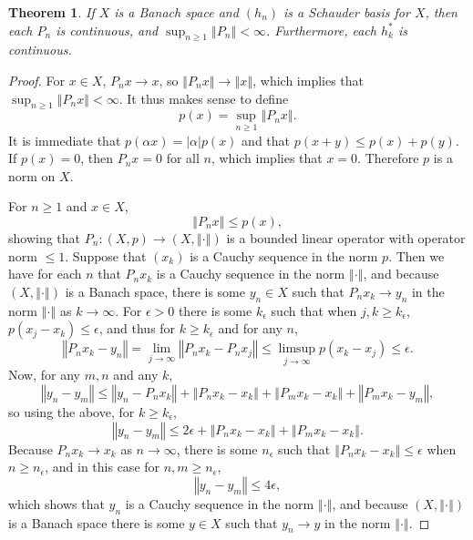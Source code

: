 \documentclass{article}
\newcommand{\norm}[1]{\left\Vert #1 \right\Vert}
\newtheorem{theorem}{Theorem}
\theoremstyle{definition}
\begin{document}
\begin{theorem}
If $X$ is a Banach space and $(h_n)$ is a Schauder basis for $X$, then each $P_n$ is continuous, and 
$\sup_{n \geq 1} \norm{P_n}<\infty$.  Furthermore, each $h_k^*$ is continuous.
\label{projections}
\end{theorem}
\begin{proof}
For $x \in X$, $P_n x \to x$, so $\norm{P_n x} \to \norm{x}$, which implies that $\sup_{n \geq 1} \norm{P_n x}<\infty$.
It thus makes sense to define
\[
p(x) = \sup_{n \geq 1} \norm{P_n x}.
\]
It is immediate that $p(\alpha x) = |\alpha| p(x)$ and that $p(x+y) \leq p(x) + p(y)$. If $p(x)=0$, then $P_nx=0$ for all $n$, 
which implies that $x=0$. Therefore $p$ is a norm on $X$. 

For $n \geq 1$ and $x \in X$,
\[
\norm{P_n x} \leq
p(x),
\]
showing that $P_n:(X,p) \to (X,\norm{\cdot})$ is a bounded linear operator with operator norm $\leq 1$. 
Suppose that $(x_k)$ is a Cauchy sequence in the norm $p$. Then we have for each $n$  that 
$P_n x_k$ is a Cauchy sequence in the norm
$\norm{\cdot}$, and because $(X,\norm{\cdot})$ is a Banach space, there is some
$y_n \in X$ such that $P_n x_k \to y_n$ in the norm $\norm{\cdot}$ as $k \to \infty$. 
For $\epsilon>0$ there is some $k_\epsilon$ such that when
$j,k \geq k_\epsilon$, $p(x_j-x_k) \leq \epsilon$, and thus for
$k \geq k_\epsilon$ and for any $n$,
\begin{equation}
\norm{P_n x_k-y_n} =  \lim_{j \to \infty} \norm{P_n x_k-P_n x_j}
\leq \limsup_{j \to \infty} p(x_k-x_j)
\leq \epsilon.
\label{Pnxk}
\end{equation}
Now, for any $m,n$ and any $k$,
\[
\norm{y_n-y_m} \leq \norm{y_n - P_n x_k}
+\norm{P_n x_k-x_k}+ \norm{P_m x_k-x_k} + \norm{P_m x_k- y_m},
\]
so using the above, for $k \geq k_\epsilon$, 
\[
\norm{y_n-y_m}  \leq 2\epsilon+\norm{P_n x_k-x_k}+ \norm{P_m x_k-x_k}.
\]
Because $P_n x_k \to x_k$ as $n \to \infty$, there is some  $n_\epsilon$ such that
$\norm{P_n x_k-x_k} \leq \epsilon$ when $n \geq n_\epsilon$, and in this case
for $n,m \geq n_\epsilon$,
\[
\norm{y_n-y_m}  \leq 4\epsilon,
\]
which shows that $y_n$ is a Cauchy sequence in the norm $\norm{\cdot}$, and because
$(X,\norm{\cdot})$ is a Banach space there is some $y \in X$ such that
$y_n \to y$ in the norm $\norm{\cdot}$. 


\end{proof}
\end{document}
